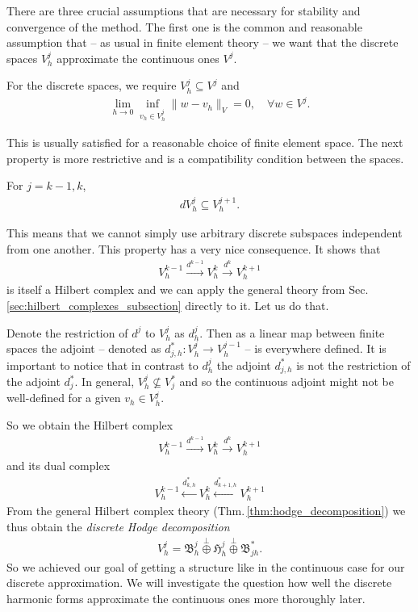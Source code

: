 \documentclass[../master_thesis.tex]{subfiles}
\begin{document}
There are three crucial assumptions that are necessary for stability and convergence 
of the method. The first one is the common and reasonable assumption that 
-- as usual in finite element theory -- we want that the discrete spaces $V_h^j$
 approximate the continuous ones $V^j$. 
\begin{assumption}\label{ass:convergence_discrete_spaces}
    For the discrete spaces, we require $V_h^j \subseteq V^j$ and
    \begin{align*}
        \lim_{h \rightarrow 0} \inf_{v_h \in V_h^j} \lVert w - v_h \rVert _V= 0, \quad \forall w \in V^j.
    \end{align*}    
\end{assumption}
This is usually satisfied for a reasonable choice of finite element space.
The next property is more restrictive and is a compatibility condition between the spaces.

\begin{assumption}
    For $j = k-1, k$,
    \begin{align*}
        dV_h^j \subseteq V_h^{j+1}.
    \end{align*}    
\end{assumption}
This means that we cannot simply use arbitrary 
discrete subspaces independent from one another. This property has a very nice
consequence. 
It shows that 
\begin{align*}
    V_h^{k-1} \xrightarrow{d^{k-1}} V_h^k \xrightarrow{d^k} V_h^{k+1}
\end{align*}
is itself a Hilbert complex and we can apply the general theory from 
Sec.\,\ref{sec:hilbert_complexes_subsection} directly to it. Let us do that.

Denote the restriction of $d^j$ to $V_h^j$ as $d_h^j$. Then as a linear map 
between finite spaces the adjoint -- denoted as $d_{j,h}^*: V_h^j \rightarrow V_h^{j-1}$ -- 
is everywhere defined. It is important to notice that in contrast to $d^j_h$ 
the adjoint $d^*_{j,h}$ is not the restriction of the adjoint $d^*_j$.
In general, $V^j_h \not\subseteq V_j^*$ and so the continuous adjoint might not be 
well-defined for a given $v_h \in V^j_h$. 

So we obtain the Hilbert complex
\begin{align}
    V_h^{k-1} \xrightarrow{d^{k-1}} V_h^{k} \xrightarrow{d^{k}} V_h^{k+1}\label{eq:discrete_hilbert_complex}
\end{align}
and its dual complex
\begin{align*}
    V_h^{k-1} \xleftarrow{d^*_{k,h}} V_h^{k} \xleftarrow{d^*_{k+1,h}} V_h^{k+1}
\end{align*}
From the general Hilbert complex theory (Thm.\,\ref{thm:hodge_decomposition})
we thus obtain the \textit{discrete Hodge decomposition}
\begin{align*}
    V_h^j = \mathfrak{B}^j_h \stackrel{\perp}{\oplus} \mathfrak{H}^j_h \stackrel{\perp}{\oplus}
        \mathfrak{B}^*_{jh}.
\end{align*}
So we achieved our goal of getting a structure like in the continuous case 
for our discrete approximation. We  will investigate the question how well the discrete harmonic 
forms approximate the continuous ones more thoroughly later.
\end{document}
